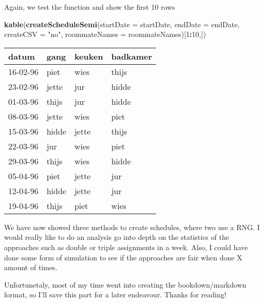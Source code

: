 \documentclass[openany]{book}
\newenvironment{Shaded}{\begin{snugshade}}{\end{snugshade}}
\newcommand{\DataTypeTok}[1]{\textcolor[rgb]{0.13,0.29,0.53}{#1}}
\newcommand{\DecValTok}[1]{\textcolor[rgb]{0.00,0.00,0.81}{#1}}
\newcommand{\KeywordTok}[1]{\textcolor[rgb]{0.13,0.29,0.53}{\textbf{#1}}}
\newcommand{\NormalTok}[1]{#1}
\newcommand{\OperatorTok}[1]{\textcolor[rgb]{0.81,0.36,0.00}{\textbf{#1}}}
\newcommand{\StringTok}[1]{\textcolor[rgb]{0.31,0.60,0.02}{#1}}
\begin{document}
Again, we test the function and show the first 10 rows

\begin{Shaded}
\begin{Highlighting}[]
\KeywordTok{kable}\NormalTok{(}\KeywordTok{createScheduleSemi}\NormalTok{(}\DataTypeTok{startDate     =}\NormalTok{ startDate,}
                         \DataTypeTok{endDate       =}\NormalTok{ endDate,}
                         \DataTypeTok{createCSV     =} \StringTok{"no"}\NormalTok{, }
                         \DataTypeTok{roommateNames =}\NormalTok{ roommateNames)[}\DecValTok{1}\OperatorTok{:}\DecValTok{10}\NormalTok{,])}
\end{Highlighting}
\end{Shaded}

\begin{tabular}{l|l|l|l}
\hline
datum & gang & keuken & badkamer\\
\hline
16-02-96 & piet & wies & thijs\\
\hline
23-02-96 & jette & jur & hidde\\
\hline
01-03-96 & thijs & jur & hidde\\
\hline
08-03-96 & jette & wies & piet\\
\hline
15-03-96 & hidde & jette & thijs\\
\hline
22-03-96 & jur & wies & piet\\
\hline
29-03-96 & thijs & wies & hidde\\
\hline
05-04-96 & piet & jette & jur\\
\hline
12-04-96 & hidde & jette & jur\\
\hline
19-04-96 & thijs & piet & wies\\
\hline
\end{tabular}

We have now showed three methods to create schedules, where two use a RNG. I would really like to do an analysis go into depth on the statistics of the approaches such as double or triple assignments in a week. Also, I could have done some form of simulation to see if the approaches are fair when done X amount of times.

Unfortunetaly, most of my time went into creating the bookdown/markdown format, so I'll save this part for a later endeavour. Thanks for reading!


\end{document}
